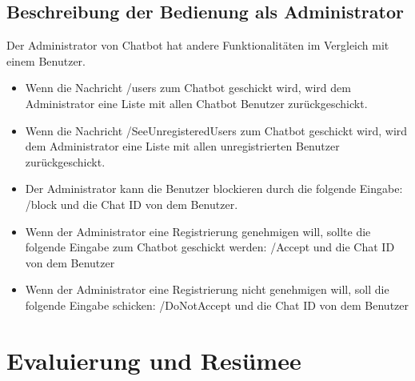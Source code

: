 \subsection{Beschreibung der Bedienung als Administrator}
Der Administrator von Chatbot hat andere Funktionalitäten im Vergleich mit einem Benutzer. 
\begin{itemize}
	\item Wenn die Nachricht /users zum Chatbot geschickt wird, wird dem Administrator eine Liste mit allen Chatbot Benutzer zurückgeschickt.
\end{itemize}
\begin{itemize}
	\item Wenn die Nachricht /SeeUnregisteredUsers zum Chatbot geschickt wird, wird dem Administrator eine Liste mit allen unregistrierten Benutzer zurückgeschickt.
\end{itemize}
\begin{itemize}
	\item Der Administrator kann die Benutzer blockieren durch die folgende Eingabe: /block und die Chat ID von dem Benutzer. 
\end{itemize}
\begin{itemize}
	\item Wenn der Administrator eine Registrierung genehmigen will, sollte die folgende Eingabe zum Chatbot geschickt werden: /Accept und die Chat ID von dem Benutzer
\end{itemize}
\begin{itemize}
	\item Wenn der Administrator eine Registrierung nicht genehmigen will, soll die folgende Eingabe schicken: /DoNotAccept und die Chat ID von dem Benutzer
\end{itemize}
\section{Evaluierung und Resümee}
